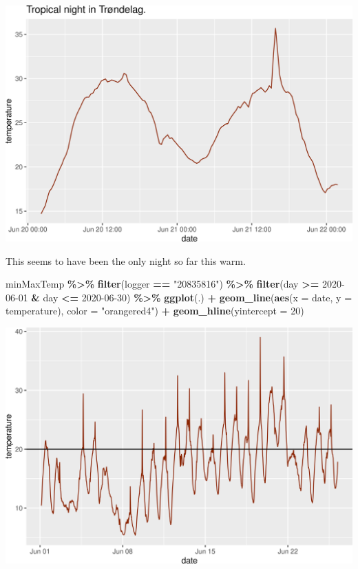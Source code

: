 \documentclass[]{article}
\newenvironment{Shaded}{\begin{snugshade}}{\end{snugshade}}
\newcommand{\DataTypeTok}[1]{\textcolor[rgb]{0.13,0.29,0.53}{#1}}
\newcommand{\DecValTok}[1]{\textcolor[rgb]{0.00,0.00,0.81}{#1}}
\newcommand{\KeywordTok}[1]{\textcolor[rgb]{0.13,0.29,0.53}{\textbf{#1}}}
\newcommand{\NormalTok}[1]{#1}
\newcommand{\OperatorTok}[1]{\textcolor[rgb]{0.81,0.36,0.00}{\textbf{#1}}}
\newcommand{\StringTok}[1]{\textcolor[rgb]{0.31,0.60,0.02}{#1}}
\begin{document}
\includegraphics{figure/unnamed-chunk-15-1.png}

This seems to have been the only night so far this warm.

\begin{Shaded}
\begin{Highlighting}[]
\NormalTok{minMaxTemp }\OperatorTok{\%>\%}\StringTok{ }
\StringTok{  }\KeywordTok{filter}\NormalTok{(logger }\OperatorTok{==}\StringTok{ "20835816"}\NormalTok{) }\OperatorTok{\%>\%}
\StringTok{  }\KeywordTok{filter}\NormalTok{(day }\OperatorTok{>=}\StringTok{ \textquotesingle{}2020{-}06{-}01\textquotesingle{}} \OperatorTok{\&}
\StringTok{           }\NormalTok{day }\OperatorTok{<=}\StringTok{ \textquotesingle{}2020{-}06{-}30\textquotesingle{}}\NormalTok{) }\OperatorTok{\%>\%}\StringTok{ }
\StringTok{  }\KeywordTok{ggplot}\NormalTok{(.) }\OperatorTok{+}
\StringTok{  }\KeywordTok{geom\_line}\NormalTok{(}\KeywordTok{aes}\NormalTok{(}\DataTypeTok{x =}\NormalTok{ date, }\DataTypeTok{y =}\NormalTok{ temperature), }\DataTypeTok{color =} \StringTok{"orangered4"}\NormalTok{) }\OperatorTok{+}
\StringTok{  }\KeywordTok{geom\_hline}\NormalTok{(}\DataTypeTok{yintercept =} \DecValTok{20}\NormalTok{) }
\end{Highlighting}
\end{Shaded}

\includegraphics{figure/unnamed-chunk-16-1.png}
\end{document}
